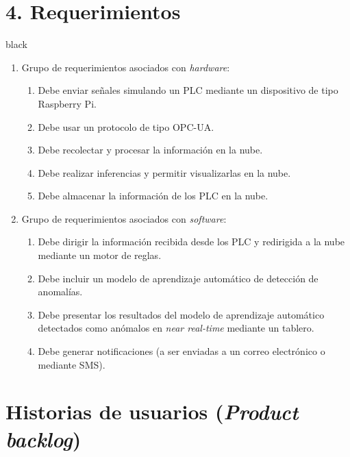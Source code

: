 \documentclass[11pt]{charter}
\begin{document}
\section{4. Requerimientos}
\label{sec:requerimientos}
\begin{consigna}{black}
\begin{enumerate}
\item Grupo de requerimientos asociados con \textit{hardware}:
	\begin{enumerate}
	\item Debe enviar señales simulando un PLC mediante un dispositivo de tipo Raspberry Pi.
	\item Debe usar un protocolo de tipo OPC-UA.
	\item Debe recolectar y procesar la información en la nube.
	\item Debe realizar inferencias y permitir visualizarlas en la nube.
	\item Debe almacenar la información de los PLC en la nube.
	\end{enumerate}
\item Grupo de requerimientos asociados con \textit{software}:
	\begin{enumerate}
	\item Debe dirigir la información recibida desde los PLC y redirigida a la nube mediante un motor de reglas.
	\item Debe incluir un modelo de aprendizaje automático de detección de anomalías.
	\item Debe presentar los resultados del modelo de aprendizaje automático detectados como anómalos en \textit{near real-time} mediante un tablero.
	\item Debe generar notificaciones (a ser enviadas a un correo electrónico o mediante SMS).
	\end{enumerate}
\end{enumerate}

\end{consigna}

\section{Historias de usuarios (\textit{Product backlog})}
\label{sec:backlog}
\end{document}
